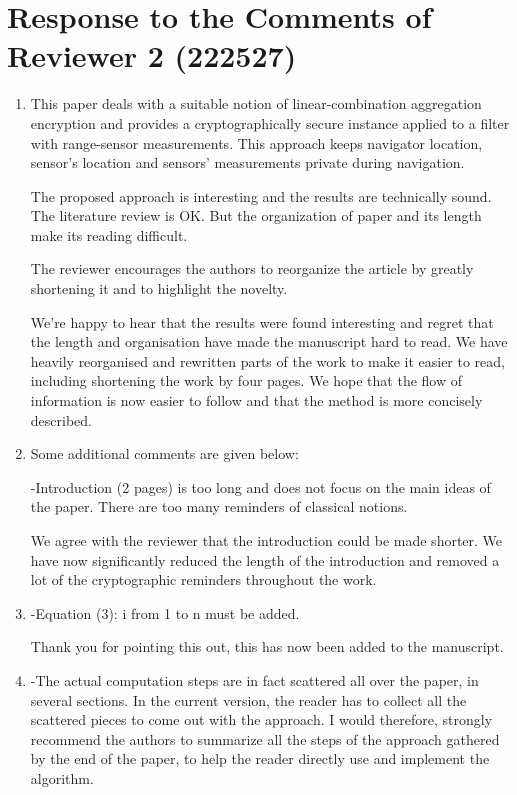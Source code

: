 \documentclass[a4paper]{scrartcl}
\newenvironment{rebuttal}{\begin{enumerate}[label={\color{grey}\thesection.\arabic{enumi}},leftmargin=0pt,ref=\thesection.\arabic{enumi}]}{\end{enumerate}}
\newcommand{\reviewtext}[1]{{\color{nblue} #1}}
\begin{document}
\section*{Response to the Comments of Reviewer 2 (222527)}
\def\thesection{R2}
\begin{rebuttal}
\item \reviewtext{This paper deals with a suitable notion of linear-combination aggregation encryption and provides a cryptographically secure instance applied to a filter with range-sensor measurements. This approach keeps navigator location, sensor's location and sensors' measurements private during navigation.

The proposed approach is interesting and the results are technically sound. The literature review is OK. But the organization of paper and its length make its reading difficult.

The reviewer encourages the authors to reorganize the article by greatly shortening it and to highlight the novelty.}

We're happy to hear that the results were found interesting and regret that the length and organisation have made the manuscript hard to read. We have heavily reorganised and rewritten parts of the work to make it easier to read, including shortening the work by four pages. We hope that the flow of information is now easier to follow and that the method is more concisely described.

\item \reviewtext{Some additional comments are given below:

-Introduction (2 pages) is too long and does not focus on the main ideas of the paper. There are too many reminders of classical notions.}

We agree with the reviewer that the introduction could be made shorter. We have now significantly reduced the length of the introduction and removed a lot of the cryptographic reminders throughout the work. 

\item \reviewtext{-Equation (3): i from 1 to n must be added.}

Thank you for pointing this out, this has now been added to the manuscript.

\item \reviewtext{-The actual computation steps are in fact scattered all over the paper, in several sections.  In the current version, the reader has to collect all the scattered pieces to come out with the approach. I would therefore, strongly recommend the authors to summarize all the steps of the approach gathered by the end of the paper, to help the reader directly use and implement the algorithm.}


\end{rebuttal}
\end{document}

